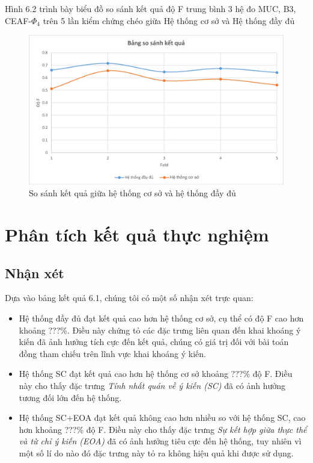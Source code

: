 \documentclass[12pt]{report}
\begin{document}
		Hình 6.2 trình bày biểu đồ so sánh kết quả độ F trung bình 3 hệ đo MUC, B3, CEAF-$\Phi_4$ trên 5 lần kiểm chứng chéo giữa Hệ thống cơ sở và Hệ thống đầy đủ
				\begin{figure}[H] 
					\centering					
					\includegraphics[scale=0.5]{charts/demo_chart.pdf}
					\caption{So sánh kết quả giữa hệ thống cơ sở và hệ thống đầy đủ}
				\end{figure} 

		\section{Phân tích kết quả thực nghiệm}
		\subsection*{Nhận xét}
		Dựa vào bảng kết quả 6.1, chúng tôi có một số nhận xét trực quan:
			\begin{itemize}
				\item{Hệ thống đầy đủ đạt kết quả cao hơn hệ thống cơ sở, cụ thể có độ F cao hơn khoảng ???\%. Điều này chứng tỏ các đặc trưng liên quan đến khai khoáng ý kiến đã ảnh hưởng tích cực đến kết quả, chúng có giá trị đối với bài toán đồng tham chiếu trên lĩnh vực khai khoáng ý kiến}.
				\item{Hệ thống SC đạt kết quả cao hơn hệ thống cơ sở khoảng ???\% độ F. Điều này cho thấy đặc trưng \textit{Tính nhất quán về ý kiến (SC)} đã có ảnh hưởng tương đối lớn đến hệ thống}.
				\item{Hệ thống SC+EOA đạt kết quả không cao hơn nhiều so với hệ thống SC, cao hơn khoảng ???\% độ F. Điều này cho thấy đặc trưng \textit{Sự kết hợp giữa thực thể và từ chỉ ý kiến (EOA)} đã có ảnh hưởng tiêu cực đến hệ thống, tuy nhiên vì một số lí do nào đó đặc trưng này tỏ ra không hiệu quả khi được sử dụng}.
			\end{itemize}
\end{document}
